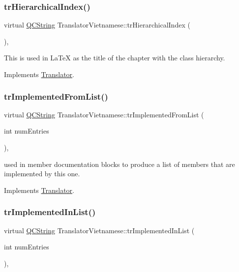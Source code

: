\subsubsection{\texorpdfstring{trHierarchicalIndex()}{trHierarchicalIndex()}}
{\footnotesize\ttfamily virtual \mbox{\hyperlink{class_q_c_string}{Q\+C\+String}} Translator\+Vietnamese\+::tr\+Hierarchical\+Index (\begin{DoxyParamCaption}{ }\end{DoxyParamCaption})\hspace{0.3cm}{\ttfamily [inline]}, {\ttfamily [virtual]}}

This is used in La\+TeX as the title of the chapter with the class hierarchy. 

Implements \mbox{\hyperlink{class_translator}{Translator}}.

\mbox{\label{class_translator_vietnamese_a7fef0dc52c8cdc4a3ee6bb89304b1c78}} 
\subsubsection{\texorpdfstring{trImplementedFromList()}{trImplementedFromList()}}
{\footnotesize\ttfamily virtual \mbox{\hyperlink{class_q_c_string}{Q\+C\+String}} Translator\+Vietnamese\+::tr\+Implemented\+From\+List (\begin{DoxyParamCaption}\item[{int}]{num\+Entries }\end{DoxyParamCaption})\hspace{0.3cm}{\ttfamily [inline]}, {\ttfamily [virtual]}}

used in member documentation blocks to produce a list of members that are implemented by this one. 

Implements \mbox{\hyperlink{class_translator}{Translator}}.

\mbox{\label{class_translator_vietnamese_a67ec542d90ee97bbe254ae4edbf7395b}} 
\subsubsection{\texorpdfstring{trImplementedInList()}{trImplementedInList()}}
{\footnotesize\ttfamily virtual \mbox{\hyperlink{class_q_c_string}{Q\+C\+String}} Translator\+Vietnamese\+::tr\+Implemented\+In\+List (\begin{DoxyParamCaption}\item[{int}]{num\+Entries }\end{DoxyParamCaption})\hspace{0.3cm}{\ttfamily [inline]}, {\ttfamily [virtual]}}

